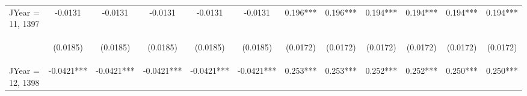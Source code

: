 \documentclass[]{article}
\begin{document}
\begin{center}
\begin{tabular}{lccccccccccc}
JYear = 11, 1397 & -0.0131 & -0.0131 & -0.0131 & -0.0131 & -0.0131 & 0.196*** & 0.196*** & 0.194*** & 0.194*** & 0.194*** & 0.194*** \\
\vspace{4pt} & \begin{footnotesize}(0.0185)\end{footnotesize} & \begin{footnotesize}(0.0185)\end{footnotesize} & \begin{footnotesize}(0.0185)\end{footnotesize} & \begin{footnotesize}(0.0185)\end{footnotesize} & \begin{footnotesize}(0.0185)\end{footnotesize} & \begin{footnotesize}(0.0172)\end{footnotesize} & \begin{footnotesize}(0.0172)\end{footnotesize} & \begin{footnotesize}(0.0172)\end{footnotesize} & \begin{footnotesize}(0.0172)\end{footnotesize} & \begin{footnotesize}(0.0172)\end{footnotesize} & \begin{footnotesize}(0.0172)\end{footnotesize} \\
JYear = 12, 1398 & -0.0421*** & -0.0421*** & -0.0421*** & -0.0421*** & -0.0421*** & 0.253*** & 0.253*** & 0.252*** & 0.252*** & 0.250*** & 0.250*** \\

\end{tabular}
\end{center}
\end{document}
